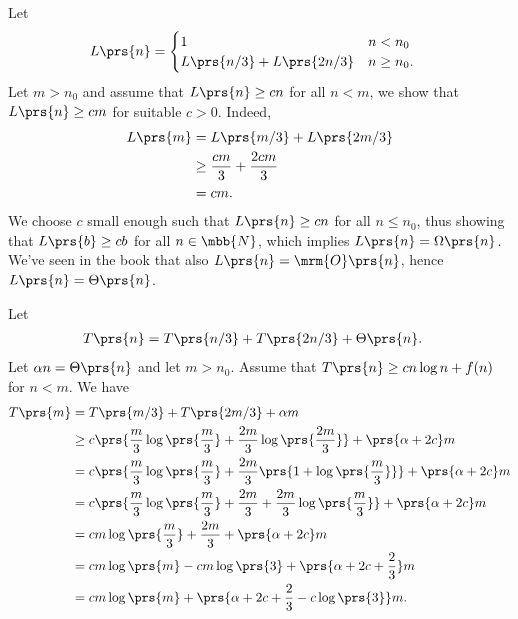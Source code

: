 \documentclass[oneside]{scrbook}
\theoremstyle{definition}
\begin{document}
\begin{exercise}
    Let
    \begin{align*}
        L\prs{n} &=
        \begin{cases}
            1 & n < n_0 \\
            L\prs{n/3} + L\prs{2n/3} & n \geq n_0 \text{.}
        \end{cases}
    \end{align*}
    Let $m > n_0$ and assume that $L\prs{n} \geq c n$ for all $n < m$, we show that $L\prs{n} \geq c m$ for suitable $c>0$.
    Indeed,
    \begin{align*}
        L\prs{m} &= L\prs{m/3} + L\prs{2m/3}
        \\&\geq \frac{cm}{3} + \frac{2cm}{3}
        \\&= cm \text{.}
    \end{align*}
    We choose $c$ small enough such that $L\prs{n} \geq cn$ for all $n \leq n_0$, thus showing that $L\prs{b} \geq cb$ for all $n \in \mbb{N}$, which implies $L\prs{n} = \Omega\prs{n}$. We've seen in the book that also $L\prs{n} = \mrm{O}\prs{n}$, hence $L\prs{n} = \Theta\prs{n}$.
\end{exercise}

\begin{exercise}
    Let
    \begin{align*}
        T\prs{n} &= T\prs{n/3} + T\prs{2n/3} + \Theta\prs{n} \text{.}
    \end{align*}
    Let $\alpha n = \Theta\prs{n}$ and let $m > n_0$. Assume that $T\prs{n} \geq c n \log n + f(n)$ for $n < m$.
    We have
    \begin{align*}
        T\prs{m} &= T\prs{m/3} + T\prs{2m/3} + \alpha m
        \\&\geq
        c \prs{\frac{m}{3} \log\prs{\frac{m}{3}} + \frac{2m}{3} \log\prs{\frac{2m}{3}}} + \prs{\alpha + 2c} m
        \\&=
        c \prs{\frac{m}{3} \log\prs{\frac{m}{3}} + \frac{2m}{3} \prs{1 + \log\prs{\frac{m}{3}}}} + \prs{\alpha + 2c} m
        \\&= c \prs{\frac{m}{3} \log\prs{\frac{m}{3}} + \frac{2m}{3} + \frac{2m}{3} \log\prs{\frac{m}{3}}} + \prs{\alpha + 2c} m
        \\&= cm \log\prs{\frac{m}{3}} + \frac{2m}{3} + \prs{\alpha + 2c} m
        \\&= cm \log\prs{m} - cm \log\prs{3} + \prs{\alpha + 2c + \frac{2}{3}} m
        \\&= cm \log\prs{m} + \prs{\alpha + 2c + \frac{2}{3} - c \log\prs{3}} m \text{.}
    \end{align*}
\end{exercise}

\printbibliography
\printindex
\end{document}

